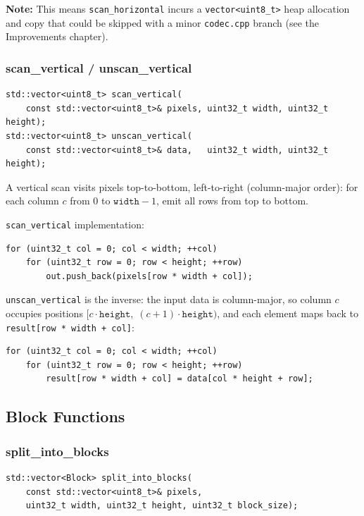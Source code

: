 \textbf{Note:} This means \texttt{scan\_horizontal} incurs a \texttt{vector\textless uint8\_t\textgreater}
heap allocation and copy that could be skipped with a minor \texttt{codec.cpp} branch
(see the Improvements chapter).

\subsubsection{scan\_vertical / unscan\_vertical}

\begin{lstlisting}[style=cpp]
std::vector<uint8_t> scan_vertical(
    const std::vector<uint8_t>& pixels, uint32_t width, uint32_t height);
std::vector<uint8_t> unscan_vertical(
    const std::vector<uint8_t>& data,   uint32_t width, uint32_t height);
\end{lstlisting}

A vertical scan visits pixels top-to-bottom, left-to-right (column-major order):
for each column $c$ from 0 to $\mathtt{width}-1$, emit all rows from top to bottom.

\texttt{scan\_vertical} implementation:
\begin{lstlisting}[style=cpp]
for (uint32_t col = 0; col < width; ++col)
    for (uint32_t row = 0; row < height; ++row)
        out.push_back(pixels[row * width + col]);
\end{lstlisting}

\texttt{unscan\_vertical} is the inverse: the input data is column-major, so column
$c$ occupies positions $[c \cdot \mathtt{height},\; (c+1) \cdot \mathtt{height})$,
and each element maps back to \texttt{result[row * width + col]}:
\begin{lstlisting}[style=cpp]
for (uint32_t col = 0; col < width; ++col)
    for (uint32_t row = 0; row < height; ++row)
        result[row * width + col] = data[col * height + row];
\end{lstlisting}

\subsection{Block Functions}

\subsubsection{split\_into\_blocks}

\begin{lstlisting}[style=cpp]
std::vector<Block> split_into_blocks(
    const std::vector<uint8_t>& pixels,
    uint32_t width, uint32_t height, uint32_t block_size);
\end{lstlisting}

